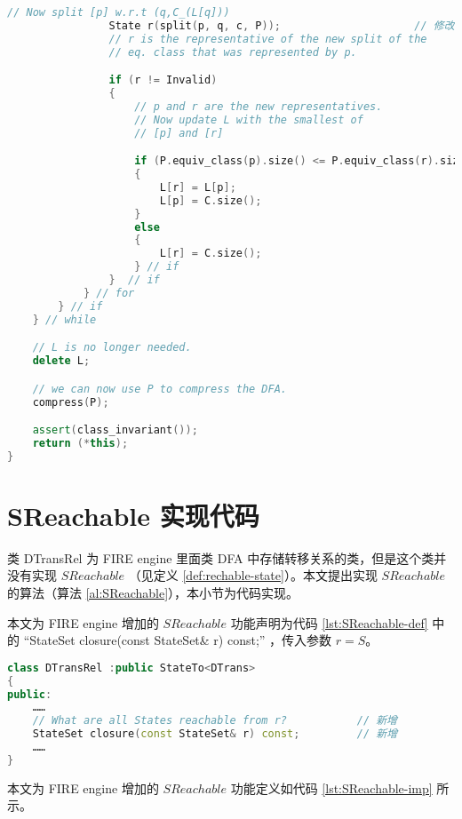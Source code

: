 \begin{lstlisting}[language=C++,label={lst:hop},caption={文件 min-hop.cpp}]
                // Now split [p] w.r.t (q,C_(L[q]))
                State r(split(p, q, c, P));                     // 修改
                // r is the representative of the new split of the 
                // eq. class that was represented by p.

                if (r != Invalid)
                {
                    // p and r are the new representatives.
                    // Now update L with the smallest of
                    // [p] and [r]

                    if (P.equiv_class(p).size() <= P.equiv_class(r).size())
                    {
                        L[r] = L[p];
                        L[p] = C.size();
                    }
                    else
                    {
                        L[r] = C.size();
                    } // if
                }  // if
            } // for
        } // if
    } // while

    // L is no longer needed.
    delete L;

    // we can now use P to compress the DFA.
    compress(P);

    assert(class_invariant());
    return (*this);
}
\end{lstlisting}


\section{SReachable 实现代码}\label{sec:SReachable-imp}

类 DTransRel 为 FIRE engine 里面类 DFA 中存储转移关系的类，但是这个类并没有实现 $SReachable$ （见定义 \ref{def:rechable-state}）。本文提出实现 $SReachable$ 的算法（算法 \ref{al:SReachable}），本小节为代码实现。

本文为 FIRE engine 增加的 $SReachable$ 功能声明为代码 \ref{lst:SReachable-def} 中的 “StateSet closure(const StateSet\& r) const;” ，传入参数 $r=S$。

\begin{lstlisting}[language=C++,label={lst:SReachable-def},caption={文件 DTransRel.h}]
class DTransRel :public StateTo<DTrans>
{
public:
    ……
    // What are all States reachable from r?           // 新增
    StateSet closure(const StateSet& r) const;         // 新增
    ……
}
\end{lstlisting}

本文为 FIRE engine 增加的 $SReachable$ 功能定义如代码 \ref{lst:SReachable-imp} 所示。

